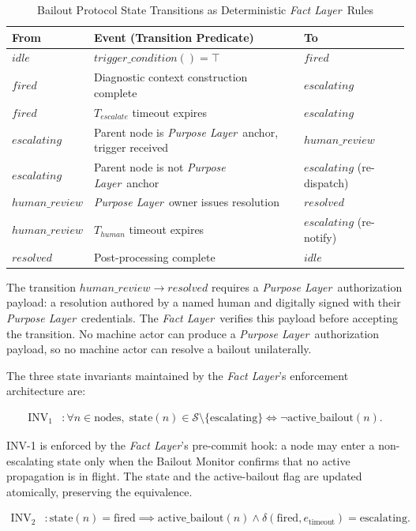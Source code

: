 \documentclass[12pt]{article}
\newcommand{\purpose}{\textit{Purpose Layer}}
\newcommand{\fact}{\textit{Fact Layer}}
\begin{document}
\begin{table}[H]
\centering
\caption{Bailout Protocol State Transitions as Deterministic \fact\ Rules}
\label{tab:bailout-transitions}
\begin{tabular}{@{}lp{5.5cm}l@{}}
\toprule
\textbf{From} & \textbf{Event (Transition Predicate)} & \textbf{To} \\
\midrule
$idle$ & $trigger\_condition() = \top$ & $fired$ \\
$fired$ & Diagnostic context construction complete & $escalating$ \\
$fired$ & $T_{escalate}$ timeout expires & $escalating$ \\
$escalating$ & Parent node is \purpose\ anchor, trigger received & $human\_review$ \\
$escalating$ & Parent node is not \purpose\ anchor & $escalating$ (re-dispatch) \\
$human\_review$ & \purpose\ owner issues resolution & $resolved$ \\
$human\_review$ & $T_{human}$ timeout expires & $escalating$ (re-notify) \\
$resolved$ & Post-processing complete & $idle$ \\
\bottomrule
\end{tabular}
\end{table}

The transition $human\_review \rightarrow resolved$ requires a \purpose\ authorization payload: a resolution authored by a named human and digitally signed with their \purpose\ credentials. The \fact\ verifies this payload before accepting the transition. No machine actor can produce a \purpose\ authorization payload, so no machine actor can resolve a bailout unilaterally.

The three state invariants maintained by the \fact's enforcement architecture are:

\begin{align}
\mathrm{INV}_1 &: \forall n \in \mathrm{nodes},\; \mathrm{state}(n) \in \mathcal{S} \setminus \{\mathrm{escalating}\} \iff \neg\mathrm{active\_bailout}(n). \tag{INV-1}
\end{align}

INV-1 is enforced by the \fact's pre-commit hook: a node may enter a non-escalating state only when the Bailout Monitor confirms that no active propagation is in flight. The state and the active-bailout flag are updated atomically, preserving the equivalence.

\begin{align}
\mathrm{INV}_2 &: \mathrm{state}(n) = \mathrm{fired} \implies \mathrm{active\_bailout}(n) \land \delta(\mathrm{fired}, e_{\mathrm{timeout}}) = \mathrm{escalating}. \tag{INV-2}
\end{align}
\end{document}
